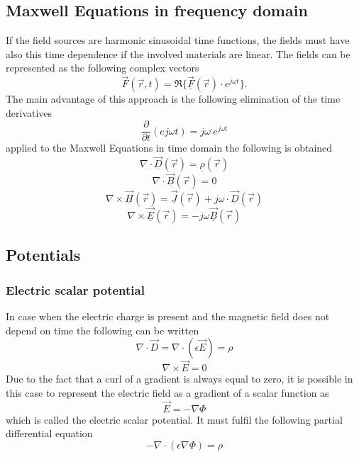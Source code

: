 \subsection{Maxwell Equations in frequency domain}
If the field sources are harmonic sinusoidal time functions, the fields must have also this time dependence if the involved materials are linear. The fields can be represented as the following complex vectors
\begin{equation*}
	\vec{F}\left(\vec{r},t\right) = \Re\{\underline{\vec{F}}\left(\vec{r}\right) \cdot e^{j\omega t}\}.
\end{equation*}
The main advantage of this approach is the following elimination of the time derivatives
\begin{equation*}
	\frac{\partial}{\partial t}\left(e{j \omega t}\right) = j \omega^\cdot e^{j \omega t}
\end{equation*}
applied to the Maxwell Equations in time domain the following is obtained
\begin{equation*}
	\nabla \cdot \underline{\vec{D}}\left(\vec{r}\right) = \underline{\rho}\left(\vec{r}\right)
\end{equation*}
\begin{equation*}
	\nabla \cdot \underline{\vec{B}}\left(\vec{r}\right) = 0
\end{equation*}
\begin{equation*}
	\nabla \times \underline{\vec{H}}\left(\vec{r}\right) = \underline{\vec{J}}\left(\vec{r}\right) + j \omega \cdot \underline{\vec{D}}\left(\vec{r}\right)
\end{equation*}
\begin{equation*}
	\nabla \times \underline{\vec{E}}\left(\vec{r}\right) = - j\omega \underline{\vec{B}}\left(\vec{r}\right)
\end{equation*}

\subsection{Potentials}
\subsubsection{Electric scalar potential}
In case when the electric charge is present and the magnetic field does not depend on time the following can be written
\begin{equation*}
	\nabla \cdot \vec{D} = \nabla \cdot \left(\epsilon \vec{E}\right) = \rho
\end{equation*}
\begin{equation*}
	\nabla \times \vec{E} = 0
\end{equation*}
Due to the fact that a curl of a gradient is always equal to zero, it is possible in this case to represent the electric field as a gradient of a scalar function as
\begin{equation*}
	\vec{E} = -\nabla \Phi
\end{equation*}
which is called the electric scalar potential. It must fulfil the following partial differential equation
\begin{equation*}
	-\nabla \cdot \left(\epsilon \nabla \Phi\right) = \rho
\end{equation*}

